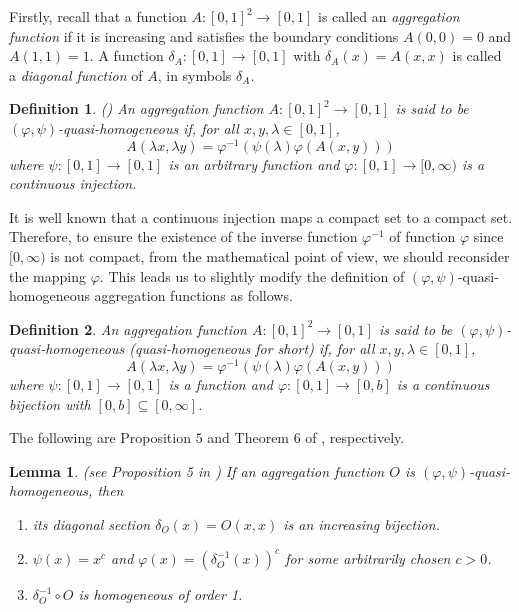 \documentclass[12pt]{article}
\newtheorem{definition}{\bf Definition}[section]
\newtheorem{lemma}{\bf Lemma}[section]
\begin{document}
Firstly, recall that a function $A: [0, 1]^2\rightarrow[0, 1]$ is called an \emph{aggregation function} if it is increasing and satisfies the boundary conditions $A(0, 0) = 0$ and $A(1, 1) = 1$.  A function $\delta_{A}: [0, 1] \rightarrow[0, 1]$ with
$\delta_{A}(x) = A(x, x)$ is called a \emph{diagonal function} of $A$, in symbols $\delta_A$.

\begin{definition}\label{def2.2}(\cite{Su2022})
\emph{An aggregation function $A:[0, 1]^2\rightarrow[0, 1]$ is said to be $(\varphi, \psi)$-quasi-homogeneous
if, for all $ x, y, \lambda\in[0, 1]$,
 \begin{equation*}
 A(\lambda x, \lambda y) =\varphi^{-1}(\psi(\lambda)\varphi(A(x, y)))
  \end{equation*}
where $\psi:[0, 1] \rightarrow[0, 1]$ is an arbitrary function and $\varphi:[0, 1] \rightarrow[0, \infty)$ is a continuous injection.}
\end{definition}

It is well known that a continuous injection maps a compact set to a compact set. Therefore, to ensure the existence of the inverse function $\varphi^{-1}$ of function $\varphi$ since $[0, \infty)$ is not compact, from the mathematical point of view, we should reconsider the mapping $\varphi$. This leads us to slightly modify the definition of $(\varphi, \psi)$-quasi-homogeneous aggregation functions as follows.
\begin{definition}\label{def2.1}
\emph{An aggregation function $A:[0, 1]^2\rightarrow[0, 1]$ is said to be} $(\varphi, \psi)$-quasi-homogeneous
(quasi-homogeneous \emph{for short) if, for all $ x, y, \lambda\in[0, 1]$,}
 \begin{equation}\label{eq2.1}
 A(\lambda x, \lambda y) =\varphi^{-1}(\psi(\lambda)\varphi(A(x, y)))
  \end{equation}
\emph{where $\psi:[0, 1] \rightarrow[0, 1]$ is a function and $\varphi:[0, 1] \rightarrow[0, b]$ is a continuous bijection with $[0, b]\subseteq[0, \infty]$.}
\end{definition}

The following are Proposition $5$ and Theorem $6$ of \cite{Su2022}, respectively.
\begin{lemma}\label{Lemma2.1}(see Proposition 5 in \cite{Su2022})
If an aggregation function $O$ is $(\varphi, \psi)$-quasi-homogeneous, then
\begin{enumerate}
\item [(\romannumeral 1)] its diagonal section $\delta_O(x)=O(x, x)$ is an increasing bijection.
\item [(\romannumeral 2)] $\psi(x)=x^c$ and $\varphi(x)=(\delta^{-1}_O(x))^c$ for some arbitrarily chosen $c>0$.
\item [(\romannumeral 3)] $\delta^{-1}_O\circ O$ is homogeneous of order 1.
\end{enumerate}
\end{lemma}
\end{document}
